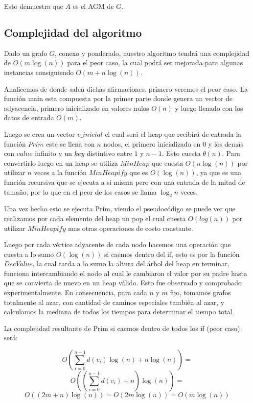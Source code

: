 Esto demuestra que $A$ es el AGM de $G$.

\subsection{Complejidad del algoritmo}

Dado un grafo $G$, conexo y ponderado, nuestro algoritmo tendrá una complejidad de $O(m \log(n))$ para el peor caso, la cual podrá ser mejorada para algunas instancias consiguiendo $O(m + n \log(n))$.

Analicemos de donde salen dichas afirmaciones. primero veremos el peor caso. La función main esta compuesta por la primer parte donde  genera un vector de adyacencia, primero inicializado en valores nulos $O(n)$ y luego llenado con los datos de entrada $O(m)$.

Luego se crea un vector $v\_inicial$ el cual será el heap que recibirá de entrada la función $Prim$ este se llena con $n$ nodos, el primero inicializado en $0$ y los demás con $value$ infinito y un $key$ distintivo entre $1$ y $n-1$. 
Esto cuesta $\theta(n)$. Para convertirlo luego en un heap se utiliza $MinHeap$ que cuesta $O(n \log(n))$ por utilizar $n$ veces a la función $MinHeapify$ que es $O(\log(n))$, ya que es una función recursiva que se ejecuta a si misma pero con una entrada de la mitad de tamaño, por lo que en el peor de los casos se llama $\log_2 n$ veces.

Una vez hecho esto se ejecuta Prim, viendo el pseudocódigo se puede ver que realizamos por cada elemento del heap un pop el cual cuesta $O(log(n))$ por utilizar $MinHeapify$ mas otras operaciones de costo constante.

Luego por cada vértice adyacente de cada nodo hacemos una operación que cuesta a lo sumo $O(\log(n))$ si caemos dentro del if, esto es por la función $DecValue$, la cual tarda a lo sumo la altura del árbol del heap en terminar, funciona intercambiando el nodo al cual le cambiaron el valor por su padre hasta que se convierta de nuevo en un heap válido.
Esto fue observado y comprobado experimentalmente. En consecuencia, para cada $n$ y $m$ fijo, tomamos grafos totalmente al azar, con cantidad de caminos especiales también al azar, y calculamos la mediana de todos los tiempos para determinar el tiempo total.

La complejidad resultante de Prim si caemos dentro de todos los if (peor caso) será:

	$$O( \sum_{i=0}^{n-1}d(v_{i}) \log(n) + n \log(n) ) = $$
	$$O( (\sum_{i=0}^{n-1}d(v_{i}) + n) \log(n) ) = $$
	$$O( (2m + n) \log(n) ) = O( 2m \log(n) ) = O(m \log(n))$$ 

